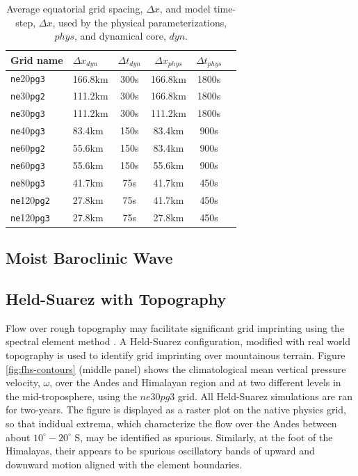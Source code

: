 \documentclass{agujournal}
\begin{document}
 \begin{table}
 \caption{Average equatorial grid spacing, $\Delta x$, and model time-step, $\Delta x$, used by the physical parameterizations, $phys$, and dynamical core, $dyn$.}
 \centering
 \begin{tabular}{llcccc}
 \hline
 Grid name & $\Delta x_{dyn}$  & $\Delta t_{dyn}$ & $\Delta x_{phys}$  & $\Delta t_{phys}$ \\
 \hline
   {\tt{ne}}20{\tt{pg3}}  & 166.8km & 300s  & 166.8km & 1800s \\
   {\tt{ne}}30{\tt{pg2}}  & 111.2km & 300s  & 166.8km & 1800s \\
   {\tt{ne}}30{\tt{pg3}}  & 111.2km & 300s  & 111.2km & 1800s \\
   {\tt{ne}}40{\tt{pg3}}  &  83.4km & 150s  &  83.4km &  900s \\
   {\tt{ne}}60{\tt{pg2}}  &  55.6km & 150s  &  83.4km &  900s \\
   {\tt{ne}}60{\tt{pg3}}  &  55.6km & 150s  &  55.6km &  900s \\
   {\tt{ne}}80{\tt{pg3}}  &  41.7km &  75s  &  41.7km &  450s \\
   {\tt{ne}}120{\tt{pg2}} &  27.8km &  75s  &  41.7km &  450s \\
   {\tt{ne}}120{\tt{pg3}} &  27.8km &  75s  &  27.8km &  450s \\
 \hline
 \end{tabular}
 \label{table:grids}
 \end{table}

\subsection{Moist Baroclinic Wave}

\subsection{Held-Suarez with Topography}

Flow over rough topography may facilitate significant grid imprinting using the spectral element method \citep{gmdd-8-4623-2015,HL2018MWR}. A Held-Suarez configuration, modified with real world topography is used to identify grid imprinting over mountainous terrain. Figure \ref{fig:fhs-contours} (middle panel) shows the climatological mean vertical pressure velocity, $\omega$, over the Andes and Himalayan region and at two different levels in the mid-troposphere, using the $ne30pg3$ grid. All Held-Suarez simulations are ran for two-years. The figure is displayed as a raster plot on the native physics grid, so that indidual extrema, which characterize the flow over the Andes between about $10^\circ-20^\circ$ S, may be identified as spurious. Similarly, at the foot of the Himalayas, their appears to be spurious oscillatory bands of upward and downward motion aligned with the element boundaries. 
\end{document}
